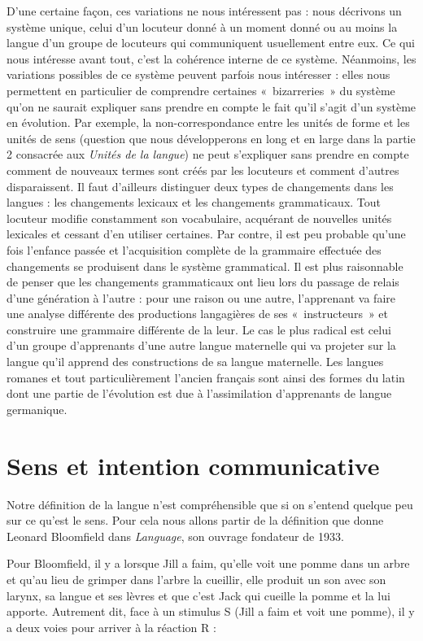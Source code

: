{    D’une certaine façon, ces variations ne nous intéressent pas : nous décrivons un système unique, celui d’un locuteur donné à un moment donné ou au moins la langue d’un groupe de locuteurs qui communiquent usuellement entre eux. Ce qui nous intéresse avant tout, c’est la cohérence interne de ce système. Néanmoins, les variations possibles de ce système peuvent parfois nous intéresser : elles nous permettent en particulier de comprendre certaines «~bizarreries~» du système qu’on ne saurait expliquer sans prendre en compte le fait qu’il s’agit d’un système en évolution. Par exemple, la non-correspondance entre les unités de forme et les unités de sens (question que nous développerons en long et en large dans la partie 2 consacrée aux \textit{Unités de la langue}) ne peut s’expliquer sans prendre en compte comment de nouveaux termes sont créés par les locuteurs et comment d’autres disparaissent. Il faut d’ailleurs distinguer deux types de changements dans les langues : les changements lexicaux et les changements grammaticaux. Tout locuteur modifie constamment son vocabulaire, acquérant de nouvelles unités lexicales et cessant d’en utiliser certaines. Par contre, il est peu probable qu’une fois l’enfance passée et l’acquisition complète de la grammaire effectuée des changements se produisent dans le système grammatical. Il est plus raisonnable de penser que les changements grammaticaux ont lieu lors du passage de relais d’une génération à l’autre : pour une raison ou une autre, l’apprenant va faire une analyse différente des productions langagières de ses «~instructeurs~» et construire une grammaire différente de la leur. Le cas le plus radical est celui d’un groupe d’apprenants d’une autre langue maternelle qui va projeter sur la langue qu’il apprend des constructions de sa langue maternelle. Les langues romanes et tout particulièrement l’ancien français sont ainsi des formes du latin dont une partie de l’évolution est due à l’assimilation d’apprenants de langue germanique.
}
\section{Sens et intention communicative}\label{sec:1.1.4}

Notre définition de la langue n’est compréhensible que si on s’entend quelque peu sur ce qu’est le sens. Pour cela nous allons partir de la définition que donne Leonard Bloomfield dans \textit{Language}, son ouvrage fondateur de 1933.

Pour Bloomfield, il y a  lorsque Jill a faim, qu’elle voit une pomme dans un arbre et qu’au lieu de grimper dans l’arbre la cueillir, elle produit un son avec son larynx, sa langue et ses lèvres et que c’est Jack qui cueille la pomme et la lui apporte. Autrement dit, face à un stimulus S (Jill a faim et voit une pomme), il y a deux voies pour arriver à la réaction R :

